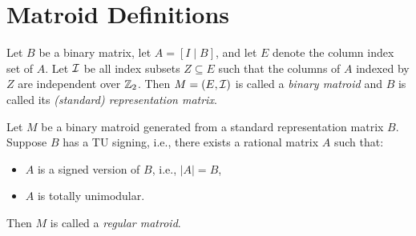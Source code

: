 \section{Matroid Definitions}

\begin{definition}
  \label{StandardRepresentation}
  \leanok
  Let $B$ be a binary matrix, let $A = \left[ I \mid B \right]$, and let $E$ denote the column index set of $A$.
  Let $\mathcal{I}$ be all index subsets $Z \subseteq E$ such that the columns of $A$ indexed by $Z$ are independent over $\mathbb{Z}_2$.
  Then $M = \left(E, \mathcal{I}\right)$ is called a \emph{binary matroid} and $B$ is called its \emph{(standard) representation matrix}.
\end{definition}

\begin{definition}
  \label{StandardRepresentation.IsRegular}
  \leanok
  Let $M$ be a binary matroid generated from a standard representation matrix $B$. Suppose $B$ has a TU signing, i.e., there exists a rational matrix $A$ such that:
  \begin{itemize}
    \item $A$ is a signed version of $B$, i.e., $\left| A \right| = B$,
    \item $A$ is totally unimodular.
  \end{itemize}
  Then $M$ is called a \emph{regular matroid}.
\end{definition}

\begin{lemma}
  \label{StandardRepresentation_toMatroid_isRegular_iff}
  \leanok %
\end{lemma}
